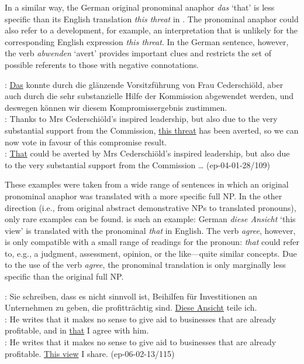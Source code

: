 \documentclass[output=paper]{LSP/langsci}
\begin{document}
In a similar way, the German original pronominal anaphor \textit{das} `that' is less specific than its English translation \textit{this threat} in . The pronominal anaphor could also refer to a development, for example, an interpretation that is unlikely  for the corresponding  English  expression \textit{this threat}. In the German sentence, however, the verb \textit{abwenden} `avert' provides important clues and restricts the set of possible referents to those with negative connotations. %
 
\ea	\label{ex:threat}
\DEo : \ul{Das} konnte durch die gl\"anzende Vor\-sitz\-f\"uhrung von Frau Cederschi\"old, aber auch durch die sehr substanzielle Hilfe der Kommission abgewendet werden, und deswegen k\"onnen wir diesem Kompromissergebnis zustimmen.\\
\ENt : Thanks to Mrs Cederschi\"old's inspired leadership, but also due to the very substantial support from the Commission, \ul{this threat} has been averted, so we can now vote in favour of this compromise result.\\
\DElit : \ul{That} could be averted by Mrs Cederschi\"old's inspired leadership, but also due to the very substantial support from the Commission \dots 
\hfill{(ep-04-01-28/109)}
\z

These examples were taken from a wide range of sentences in which an original pronominal anaphor was translated with a more specific full NP. In the other direction (i.e., from original abstract demonstrative NPs to translated pronouns), only rare examples can be found.  is such an example: German \textit{diese Ansicht} `this view' is translated with the pronominal \textit{that} in English. The verb \textit{agree}, however, is only compatible with a  small range of readings for the pronoun: \textit{that} could refer to, e.g., a judgment, assessment, opinion, or the like---quite similar concepts. Due to the use of the verb \textit{agree}, the pronominal translation is only marginally less specific than the original full NP.

\ea	\label{ex:pron_that} %
\DEo : Sie schreiben, dass es nicht sinnvoll ist, Beihilfen f\"ur Investitionen an Unternehmen zu geben, die profittr\"achtig sind. \ul{Diese Ansicht} teile ich.\\
\ENt : He writes that it makes no sense to give aid to businesses that are already profitable, and in \ul{that} I agree with him.\\
\DElit : He writes that it makes no sense to give aid to businesses that are already profitable. \ul{This view} I share. 
\hfill{(ep-06-02-13/115)}
\z
\end{document}
